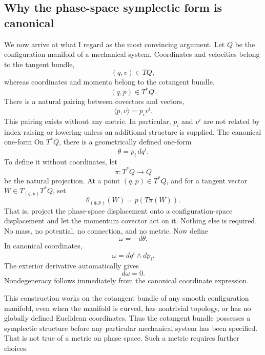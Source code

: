 \subsection{ Why the phase-space symplectic form is canonical}
We now arrive at what I regard as the most convincing argument.
Let \(Q\) be the configuration manifold of a mechanical system.
Coordinates and velocities belong to the tangent bundle,
\[
(q,v)\in TQ,
\]
whereas coordinates and momenta belong to the cotangent bundle,
\[
(q,p)\in T^*Q.
\]
There is a natural pairing between covectors and vectors,
\[
\langle p,v\rangle=p_iv^i.
\]
This pairing exists without any metric.
In particular, \(p_i\) and \(v^i\) are not related by index raising or lowering
unless an additional structure is supplied.
The canonical one-form
On \(T^*Q\), there is a geometrically defined one-form
\[
\boxed{\theta=p_i\,dq^i.}
\]
To define it without coordinates, let
\[
\pi:T^*Q\to Q
\]
be the natural projection.
At a point \((q,p)\in T^*Q\), and for a tangent vector \(W\in T_{(q,p)}T^*Q\), set
\[
\boxed{\theta_{(q,p)}(W)=p(T\pi(W)).}
\]
That is, project the phase-space displacement onto a configuration-space
displacement and let the momentum covector act on it.
Nothing else is required.
No mass, no potential, no connection, and no metric.
Now define
\[
\boxed{\omega=-d\theta.}
\]
In canonical coordinates,
\[
\boxed{\omega=dq^i\wedge dp_i.}
\]
The exterior derivative automatically gives
\[
d\omega=0.
\]
Nondegeneracy follows immediately from the canonical coordinate expression.

This construction works on the cotangent bundle of any smooth configuration
manifold, even when the manifold is curved, has nontrivial topology, or has no
globally defined Euclidean coordinates. Thus the cotangent bundle possesses a
symplectic structure before any particular mechanical system has been
specified. That is not true of a metric on phase space. Such a metric requires
further choices.

